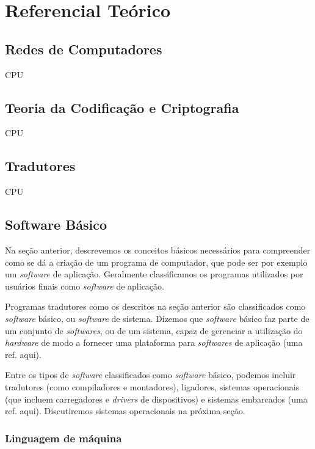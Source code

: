 
\chapter{Referencial Teórico}

\section{Redes de Computadores}

CPU

\section{Teoria da Codificação e Criptografia}

CPU

\section{Tradutores}

CPU

\section{Software Básico}

Na seção anterior, descrevemos os conceitos básicos necessários para compreender como se dá a criação de um programa de computador, que pode ser por exemplo um \textit{software} de aplicação. Geralmente classificamos os programas utilizados por usuários finais como \textit{software} de aplicação.

Programas tradutores como os descritos na seção anterior são classificados como \textit{software} básico, ou \textit{software} de sistema. Dizemos que \textit{software} básico faz parte de um conjunto de \textit{softwares}, ou de um sistema, capaz de gerenciar a utilização do \textit{hardware} de modo a fornecer uma plataforma para \textit{softwares} de aplicação (uma ref. aqui).

Entre os tipos de \textit{software} classificados como \textit{software} básico, podemos incluir tradutores (como compiladores e montadores), ligadores, sistemas operacionais (que incluem carregadores e \textit{drivers} de dispositivos) e sistemas embarcados (uma ref. aqui). Discutiremos sistemas operacionais na próxima seção.

\subsection{Linguagem de máquina}

